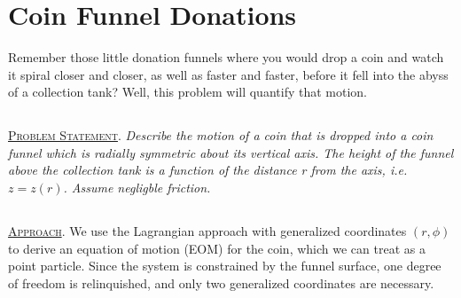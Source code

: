 \documentclass[11pt]{article}
\begin{document}


\section{Coin Funnel Donations}
Remember those little donation funnels where you would drop a coin and watch it spiral closer and closer, as well as faster and faster, before it fell into the abyss of a collection tank? Well, this problem will quantify that motion.

\subsection[Problem Statement]{} \textsc{\underline{Problem Statement}}. \textit{Describe the motion of a coin that is dropped into a coin funnel which is radially symmetric about its vertical axis. The height of the funnel above the collection tank is a function of the distance r from the axis, i.e. $z = z(r)$. Assume negligble friction.}

\subsection[Approach]{} \textsc{\underline{Approach}}. We use the Lagrangian approach with generalized coordinates $(r, \phi)$ to derive an equation of motion (EOM) for the coin, which we can treat as a point particle. Since the system is constrained by the funnel surface, one degree of freedom is relinquished, and only two generalized coordinates are necessary.
\end{document}
